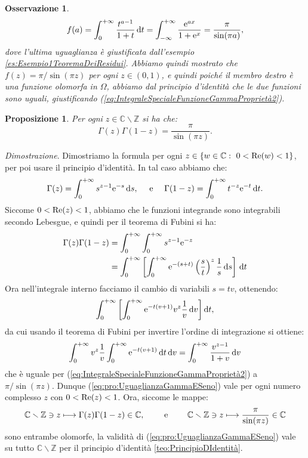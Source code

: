 \documentclass[11pt]{book}
\makeatletter
\theoremstyle{Definizione}
\theoremstyle{TeoremaProposizioneLemmaCorollarioCongettura}
\newtheorem{mypropo}[myteo]{Proposizione}
\theoremstyle{OsservazioneNotaEsempio}
\newtheorem{myobs}{Osservazione}[section]
\renewenvironment{proof}[1][\proofname]{\par
  \normalfont \topsep6\p@\@plus6\p@\relax
  \trivlist
  \item[\hskip\labelsep
        \itshape
    #1\@addpunct{.}]\ignorespaces
}{%
  \endtrivlist\@endpefalse
}
\renewenvironment{proof}{\textsl{Dimostrazione}.}{}
\newcommand{\Z}{\mathbb{Z}}
\newcommand{\C}{\mathbb{C}}
\newcommand{\tolto}{\smallsetminus}
\renewcommand{\Re}{\textup{Re}}
\newcommand{\e}{\textup{e}}
\renewcommand{\d}{\mathrm{d}}
\newcommand{\dt}{\,\d t}
\makeatother
\begin{document}
\begin{myobs}
$$
f(a) = \int_0^{+\infty}\frac{t^{a-1}}{1+t}\dt = \int_{-\infty}^{+\infty} \frac{\e^{ax}}{1+\e^{x}} = \frac{\pi}{\sin(\pi a)},
$$
dove l'ultima uguaglianza è giustificata dall'esempio \ref{es:Esempio1TeoremaDeiResidui}. Abbiamo quindi mostrato che $f(z) = \pi/\sin(\pi z)$ per ogni $z\in (0,1)$, e quindi poiché il membro destro è una funzione olomorfa in $\Omega$, abbiamo dal principio d'identità che le due funzioni sono uguali, giustificando (\ref{eq:IntegraleSpecialeFunzioneGammaProprietà2}).
\end{myobs}
\begin{boxpro}
\begin{mypropo}
Per ogni $z\in \C\tolto \Z$ si ha che:
\begin{equation}\label{eq:pro:UguaglianzaGammaESeno}
\Gamma(z)\Gamma(1-z) = \frac{\pi}{\sin(\pi z)}.
\end{equation}
\end{mypropo}
\tcblower
\begin{proof}
Dimostriamo la formula per ogni $z\in \{w\in \C:\ 0< \Re(w) < 1\}$, per poi usare il principio d'identità. In tal caso abbiamo che:
$$
\Gamma(z) = \int_0^{+\infty} s^{z-1}\e^{-s}\,\d s,\quad \textup{ e }\quad \Gamma(1-z) = \int_0^{+\infty} t^{-z}\e^{-t}\dt.
$$
Siccome $0<\Re(z)<1$, abbiamo che le funzioni integrande sono integrabili secondo Lebesgue, e quindi per il teorema di Fubini si ha:
\begin{align*}
\Gamma(z)\Gamma(1-z) &= \int_0^{+\infty} \int_0^{+\infty} s^{z-1}\e^{-z}\\
&= \int_0^{+\infty} \left[\int_0^{+\infty} \e^{-(s+t)}\left(\frac{s}{t}\right)^z\frac{1}{s}\,\d s\right]\dt
\end{align*}
Ora nell'integrale interno facciamo il cambio di variabili $s = tv$, ottenendo:
$$
\int_0^{+\infty} \left[\int_0^{+\infty} \e^{-t(v+1)} v^z \frac{1}{v}\, \d v\right]\d t,
$$
da cui usando il teorema di Fubini per invertire l'ordine di integrazione si ottiene:
$$
\int_0^{+\infty} v^z\frac{1}{v}\int_0^{+\infty} \e^{-t(v+1)} \,\d t\,\d v = \int_0^{+\infty} \frac{v^{z-1}}{1+v} \,\d v
$$
che è uguale per (\ref{eq:IntegraleSpecialeFunzioneGammaProprietà2}) a $\pi/\sin(\pi z)$. Dunque (\ref{eq:pro:UguaglianzaGammaESeno}) vale per ogni numero complesso $z$ con $0 < \Re(z) < 1$. Ora, siccome le mappe:
$$
\C \tolto \Z \ni z \longmapsto \Gamma(z)\Gamma(1-z)\in \C,\qquad \textup{ e }\qquad \C\tolto \Z \ni z \longmapsto \frac{\pi}{\sin(\pi z)}\in \C
$$
sono entrambe olomorfe, la validità di (\ref{eq:pro:UguaglianzaGammaESeno}) vale su tutto $\C \tolto \Z$ per il principio d'identità \ref{teo:PrincipioDIdentità}.
\end{proof}
\end{boxpro}
\end{document}
